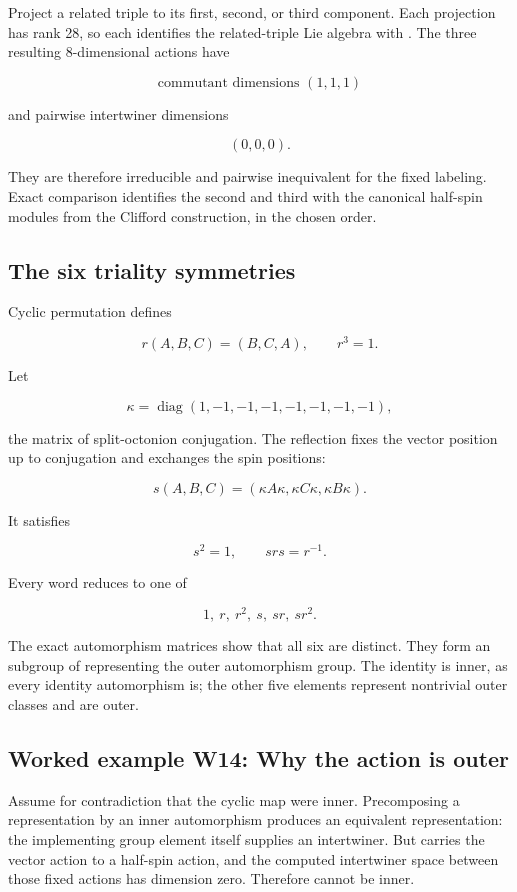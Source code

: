 \documentclass[11pt]{article}
\begin{document}
Project a related triple to its first, second, or third component. Each projection has rank 28, so each identifies the related-triple Lie algebra with \texttt{}. The three resulting 8-dimensional actions have

\[
\text{commutant dimensions }(1,1,1)
\]

and pairwise intertwiner dimensions

\[
(0,0,0).
\]

They are therefore irreducible and pairwise inequivalent for the fixed labeling. Exact comparison identifies the second and third with the canonical half-spin modules from the Clifford construction, in the chosen order.

\subsection{The six triality symmetries}

Cyclic permutation defines

\[
r(A,B,C)=(B,C,A),
\qquad r^3=1.
\]

Let

\[
\kappa=\operatorname{diag}(1,-1,-1,-1,-1,-1,-1,-1),
\]

the matrix of split-octonion conjugation. The reflection fixes the vector position up to conjugation and exchanges the spin positions:

\[
s(A,B,C)=(\kappa A\kappa,\kappa C\kappa,\kappa B\kappa).
\]

It satisfies

\[
s^2=1,\qquad srs=r^{-1}.
\]

Every word reduces to one of

\[
1,\ r,\ r^2,\ s,\ sr,\ sr^2.
\]

The exact automorphism matrices show that all six are distinct. They form an \texttt{} subgroup of \texttt{} representing the outer automorphism group. The identity is inner, as every identity automorphism is; the other five elements represent nontrivial outer classes and are outer.

\subsection{Worked example W14: Why the action is outer}

Assume for contradiction that the cyclic map were inner. Precomposing a representation by an inner automorphism produces an equivalent representation: the implementing group element itself supplies an intertwiner. But \texttt{} carries the vector action to a half-spin action, and the computed intertwiner space between those fixed actions has dimension zero. Therefore \texttt{} cannot be inner.
\end{document}
